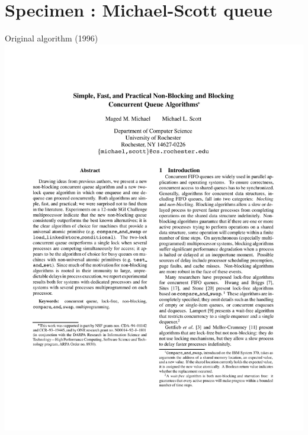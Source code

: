 \section{Specimen  : Michael-Scott queue}


\begin{frame}{Original algorithm (1996)}
\centering
\includegraphics[scale=0.5]{images/michael_scott_1996.pdf}
\end{frame}


